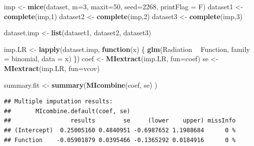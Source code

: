 \documentclass[
]{book}
\newenvironment{Shaded}{\begin{snugshade}}{\end{snugshade}}
\newcommand{\ControlFlowTok}[1]{\textcolor[rgb]{0.13,0.29,0.53}{\textbf{#1}}}
\newcommand{\DataTypeTok}[1]{\textcolor[rgb]{0.13,0.29,0.53}{#1}}
\newcommand{\DecValTok}[1]{\textcolor[rgb]{0.00,0.00,0.81}{#1}}
\newcommand{\KeywordTok}[1]{\textcolor[rgb]{0.13,0.29,0.53}{\textbf{#1}}}
\newcommand{\NormalTok}[1]{#1}
\newcommand{\OperatorTok}[1]{\textcolor[rgb]{0.81,0.36,0.00}{\textbf{#1}}}
\newcommand{\StringTok}[1]{\textcolor[rgb]{0.31,0.60,0.02}{#1}}
\begin{document}
\begin{Shaded}
\begin{Highlighting}[]
\NormalTok{imp <-}\StringTok{ }\KeywordTok{mice}\NormalTok{(dataset, }\DataTypeTok{m=}\DecValTok{3}\NormalTok{, }\DataTypeTok{maxit=}\DecValTok{50}\NormalTok{, }\DataTypeTok{seed=}\DecValTok{2268}\NormalTok{, }\DataTypeTok{printFlag =}\NormalTok{ F)}
\NormalTok{dataset1 <-}\StringTok{ }\KeywordTok{complete}\NormalTok{(imp,}\DecValTok{1}\NormalTok{)}
\NormalTok{dataset2 <-}\StringTok{ }\KeywordTok{complete}\NormalTok{(imp,}\DecValTok{2}\NormalTok{)}
\NormalTok{dataset3 <-}\StringTok{ }\KeywordTok{complete}\NormalTok{(imp,}\DecValTok{3}\NormalTok{)}
 
\NormalTok{dataset.imp <-}\StringTok{ }\KeywordTok{list}\NormalTok{(dataset1, dataset2, dataset3)}
 
\NormalTok{imp.LR <-}\StringTok{ }\KeywordTok{lapply}\NormalTok{(dataset.imp, }\ControlFlowTok{function}\NormalTok{(x) \{}
   \KeywordTok{glm}\NormalTok{(Radiation }\OperatorTok{~}\StringTok{ }\NormalTok{Function, }\DataTypeTok{family =}\NormalTok{ binomial, }\DataTypeTok{data =}\NormalTok{ x)}
\NormalTok{  \})}
\NormalTok{coef <-}\StringTok{ }\KeywordTok{MIextract}\NormalTok{(imp.LR, }\DataTypeTok{fun=}\NormalTok{coef) }
\NormalTok{se <-}\StringTok{ }\KeywordTok{MIextract}\NormalTok{(imp.LR, }\DataTypeTok{fun=}\NormalTok{vcov) }
 
\NormalTok{summary.fit <-}\StringTok{ }\KeywordTok{summary}\NormalTok{(}\KeywordTok{MIcombine}\NormalTok{(coef, se) )}
\end{Highlighting}
\end{Shaded}

\begin{verbatim}
## Multiple imputation results:
##       MIcombine.default(coef, se)
##                 results        se     (lower    upper) missInfo
## (Intercept)  0.25005160 0.4840951 -0.6987652 1.1988684      0 %
## Function    -0.05901879 0.0395466 -0.1365292 0.0184916      0 %
\end{verbatim}

\begin{Shaded}
\end{Shaded}
\end{document}
